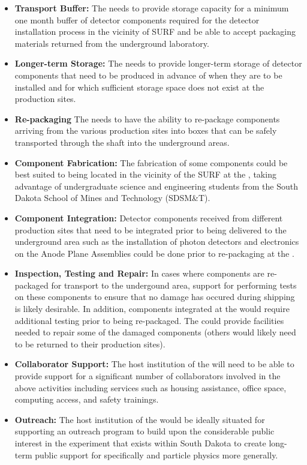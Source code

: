 \begin{itemize}
  \item {\bf Transport Buffer:} The  needs to provide
    storage capacity for a minimum one month buffer of detector
    components required for the detector installation process in the
    vicinity of SURF and be able to accept packaging materials
    returned from the underground laboratory.
  \item {\bf Longer-term Storage:} The  needs to provide
    longer-term storage of detector components that need to be
    produced in advance of when they are to be installed and for which
    sufficient storage space does not exist at the production sites.
  \item {\bf Re-packaging} The  needs to have the ability
    to re-package components arriving from the various production
    sites into boxes that can be safely transported through the shaft
    into the underground areas.
  \item {\bf Component Fabrication:} The fabrication of some
    components could be best suited to being located in the vicinity
    of the SURF at the , taking advantage of
    undergraduate science and engineering students from the South
    Dakota School of Mines and Technology (SDSM\&T).
  \item {\bf Component Integration:} Detector components received from 
    different production sites that need to be integrated prior to being 
    delivered to the underground area such as the installation of photon 
    detectors and electronics on the Anode Plane Assemblies could be done
    prior to re-packaging at the .    
  \item {\bf Inspection, Testing and Repair:} In cases where
    components are re-packaged for transport to the undergound area,
     support for performing tests on these components to
    ensure that no damage has occured during shipping is likely
    desirable.  In addition, components integrated at the 
    would require additional testing prior to being re-packaged.  The
     could provide facilities needed to repair some of the
    damaged components (others would likely need to be returned to
    their production sites).
  \item {\bf Collaborator Support:} The host institution of the 
    will need to be able to provide support for a significant number
    of  collaborators involved in the above activities
    including services such as housing assistance, office space,
    computing access, and safety trainings.
  \item {\bf Outreach:} The host institution of the  would be
    ideally situated for supporting an outreach program to build upon
    the considerable public interest in the experiment that exists
    within South Dakota to create long-term public support for
     specifically and particle physics more generally.
\end{itemize}

